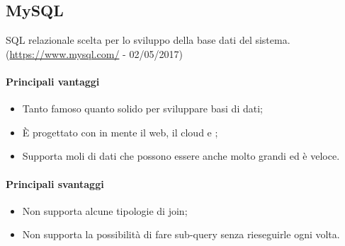 \documentclass[../PianoDiQualifica.tex]{subfiles}
\begin{document}
		\subsection{MySQL}
			 SQL relazionale scelta per lo sviluppo della base dati del sistema.\\
			(\url{https://www.mysql.com/} - 02/05/2017) 
			\paragraph{Principali vantaggi}
			\begin{itemize}
					\item Tanto famoso quanto solido per sviluppare basi di dati;
					\item È progettato con in mente il web, il cloud e ;
					\item Supporta moli di dati che possono essere anche molto grandi ed è veloce.
				\end{itemize}
			\paragraph{Principali svantaggi}
				\begin{itemize}
					\item Non supporta alcune tipologie di join;
					\item Non supporta la possibilità di fare sub-query senza rieseguirle ogni volta.
				\end{itemize}
\end{document}
